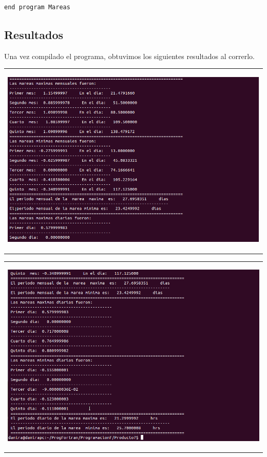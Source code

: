 \documentclass[10pt]{article}
\begin{document}
\begin{verbatim}
end program Mareas

\end{verbatim} 

\newpage
\subsection{Resultados}
Una vez compilado el programa, obtuvimos los siguientes resultados al correrlo.\\

\begin{tabular}{c}
\begin{center}
   \includegraphics[scale=0.4]{mareasprint1.png}
\end{center}
\end{tabular}


\begin{tabular}{c}
\begin{center}
   \includegraphics[scale=0.4]{mareasprint2.png}
\end{center}
\end{tabular}
\end{document}
